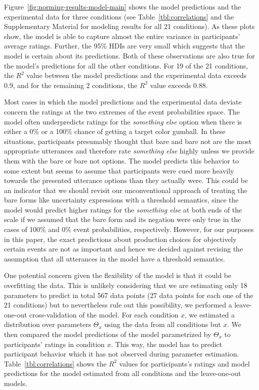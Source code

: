 \documentclass[lucida,biblatex]{sp} %
\begin{document}
Figure~\ref{fig:norming-results-model-main} shows the model predictions and the experimental data for three conditions 
(see Table~\ref{tbl:correlations} and the Supplementary Material for modeling results for all 21 conditions). As these plots show, the model
is able to capture almost the entire variance in participants' average ratings. Further, the 95\% HDIs are very small which suggests
that the model is certain about its predictions. Both of these observations are also true for the model's predictions for all the other
conditions. For 19 of the 21 conditions, the $R^2$ value between the model predictions and the experimental data exceeds 0.9,
and for the remaining 2 conditions, the $R^2$ value exceeds 0.88. 

Most cases in which the model predictions and the experimental data deviate concern the ratings at the two extremes of the event probabilities space.
The model often underpredicts ratings for the \textit{something else} option when there is either a 0\% or a 100\% chance of 
getting a target color gumball. In these situations, participants presumably thought that {\sc bare} and {\sc bare not} are the most appropriate
utterances and therefore rate \textit{something else} highly unless we provide them with the {\sc bare} or {\sc bare not} options. The model predicts
this behavior to some extent but seems to assume that participants were cued more heavily towards the presented utterance options than they actually were.
This could be an indicator that we should revisit our unconventional approach of treating the bare forms like uncertainty expressions with a threshold semantics,
since the model would predict higher ratings for the \textit{something else} at both ends of the scale if we assumed that the bare form and its negation were only true
in the cases of 100\% and 0\% event probabilities, respectively. 
However, for our purposes in this paper, the exact predictions about production choices for objectively certain events are not as important and hence
we decided against revising the assumption that all utterances in the model have a threshold semantics.


One potential concern given the flexibility of the model is that it could be overfitting the data. 
This is unlikely considering that we are estimating only 18 parameters to predict in total 567 data points 
(27 data points for each one of the 21 conditions) but to nevertheless rule out this possibility, we performed a leave-one-out cross-validation of
the model. For each condition $x$, we estimated a distribution over parameters $\Theta_x$ using the data from all conditions but $x$. We then
compared the model predictions of the model parametrized by $\Theta_x$ to participants' ratings in condition $x$. This way, the model has to predict
participant behavior which it has not observed during parameter estimation. Table~\ref{tbl:correlations} shows the $R^2$ values for participants's
ratings and model predictions for the model estimated from all conditions and the leave-one-out models.
\end{document}
